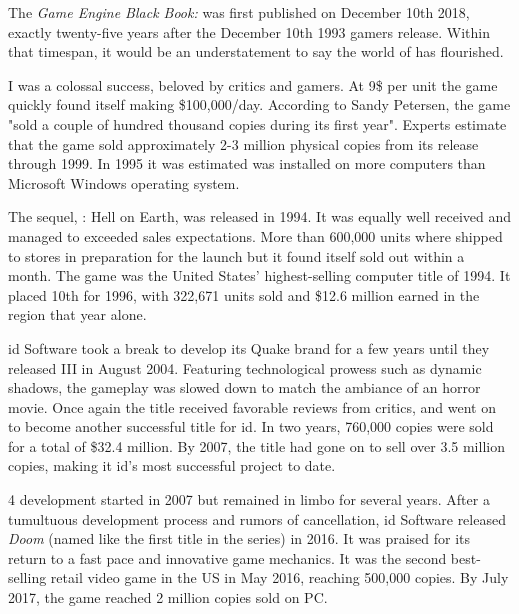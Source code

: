 The \textit{Game Engine Black Book: \doom{}} was first published on December 10th 2018, exactly twenty-five years after the December 10th 1993 gamers release. Within that timespan, it would be an understatement to say the world of \doom{} has flourished.\\
\par
\doom{} I was a colossal success, beloved by critics and gamers. At 9\$ per unit the game quickly found itself making \$100,000/day. According to Sandy Petersen, the game "sold a couple of hundred thousand copies during its first year". Experts estimate that the game sold approximately 2-3 million physical copies from its release through 1999. In 1995 it was estimated \doom{} was installed on more computers than Microsoft Windows operating system.\\
\par
The sequel, \doomii{}: Hell on Earth, was released in 1994. It was equally well received and managed to exceeded sales expectations. More than 600,000 units where shipped to stores in preparation for the launch but it found itself sold out within a month. The game was the United States' highest-selling computer title of 1994. It placed 10th for 1996, with 322,671 units sold and \$12.6 million earned in the region that year alone.\\
\par
id Software took a break to develop its Quake brand for a few years until they released \doom{} III in August 2004. Featuring technological prowess such as dynamic shadows, the gameplay was slowed down to match the ambiance of an horror movie. Once again the title received favorable reviews from critics, and went on to become another successful title for id. In two years, 760,000 copies were sold for a total of \$32.4 million.  By 2007, the title had gone on to sell over 3.5 million copies, making it id's most successful project to date.\\
\par
 \doom{} 4 development started in 2007 but remained in limbo for several years. After a tumultuous development process and rumors of cancellation, id Software released \textit{Doom} (named like the first title in the series) in 2016. It was praised for its return to a fast pace and innovative game mechanics. It was the second best-selling retail video game in the US in May 2016, reaching 500,000 copies. By July 2017, the game reached 2 million copies sold on PC.\\
\par






